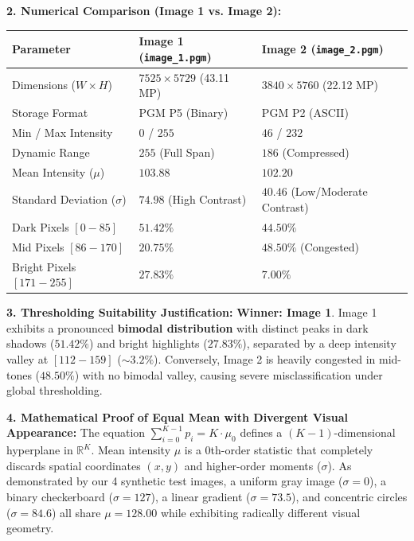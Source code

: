 \documentclass[12pt]{article}
\begin{document}
\textbf{2. Numerical Comparison (Image 1 vs. Image 2):}
\begin{table}[H]
\centering
\small
\begin{tabular}{@{}lll@{}}
\toprule
\textbf{Parameter} & \textbf{Image 1 (\texttt{image\_1.pgm})} & \textbf{Image 2 (\texttt{image\_2.pgm})} \\ \midrule
Dimensions ($W \times H$) & $7525 \times 5729$ (43.11 MP) & $3840 \times 5760$ (22.12 MP) \\
Storage Format & PGM P5 (Binary) & PGM P2 (ASCII) \\
Min / Max Intensity & $0$ / $255$ & $46$ / $232$ \\
Dynamic Range & $255$ (Full Span) & $186$ (Compressed) \\
Mean Intensity ($\mu$) & $103.88$ & $102.20$ \\
Standard Deviation ($\sigma$) & $\mathbf{74.98}$ (High Contrast) & $\mathbf{40.46}$ (Low/Moderate Contrast) \\
Dark Pixels $[0 - 85]$ & $51.42\%$ & $44.50\%$ \\
Mid Pixels $[86 - 170]$ & $20.75\%$ & $48.50\%$ (Congested) \\
Bright Pixels $[171 - 255]$ & $27.83\%$ & $7.00\%$ \\ \bottomrule
\end{tabular}
\end{table}

\textbf{3. Thresholding Suitability Justification:}
\textbf{Winner: Image 1}. Image 1 exhibits a pronounced \textbf{bimodal distribution} with distinct peaks in dark shadows ($51.42\%$) and bright highlights ($27.83\%$), separated by a deep intensity valley at $[112 - 159]$ ($\sim 3.2\%$). Conversely, Image 2 is heavily congested in mid-tones ($48.50\%$) with no bimodal valley, causing severe misclassification under global thresholding.

\textbf{4. Mathematical Proof of Equal Mean with Divergent Visual Appearance:}
The equation $\sum_{i=0}^{K-1} p_i = K \cdot \mu_0$ defines a $(K-1)$-dimensional hyperplane in $\mathbb{R}^K$. Mean intensity $\mu$ is a 0th-order statistic that completely discards spatial coordinates $(x, y)$ and higher-order moments ($\sigma$). As demonstrated by our 4 synthetic test images, a uniform gray image ($\sigma=0$), a binary checkerboard ($\sigma=127$), a linear gradient ($\sigma=73.5$), and concentric circles ($\sigma=84.6$) all share $\mu = 128.00$ while exhibiting radically different visual geometry.
\end{document}
